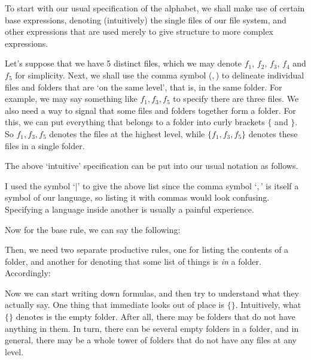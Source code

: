 To start with our usual specification of the alphabet, we shall make use of certain base expressions, denoting (intuitively) the single files of our file system, and other expressions that are used merely to give structure to more complex expressions. 

Let's suppose that we have 5 distinct files, which we may denote $f_1$, $f_2$, $f_3$, $f_4$ and $f_5$ for simplicity. Next, we shall use the comma symbol ($,$) to delineate individual files and folders that are `on the same level', that is, in the same folder. For example, we may say something like $f_1, f_3, f_5$ to specify there are three files. We also need a way to signal that some files and folders together form a folder. For this, we can put everything that belongs to a folder into curly brackets $\{$ and $\}$. So $f_1, f_3, f_5$ denotes the files at the highest level, while $\{f_1, f_3, f_5\}$ denotes these files in a single folder. 

The above `intuitive' specification can be put into our usual notation as follows.


I used the symbol `$\mid$' to give the above list since the comma symbol `$,$' is itself a symbol of our language, so listing it with commas would look confusing. Specifying a language inside another is usually a painful experience. 

Now for the base rule, we can say the following:


Then, we need two separate productive rules, one for listing the contents of a folder, and another for denoting that some list of things is \textit{in} a folder. Accordingly:



Now we can start writing down formulas, and then try to understand what they actually say. One thing that immediate looks out of place is $\{\}$. Intuitively, what $\{\}$ denotes is the empty folder. After all, there may be folders that do not have anything in them. In turn, there can be several empty folders in a folder, and in general, there may be a whole tower of folders that do not have any files at any level. 

